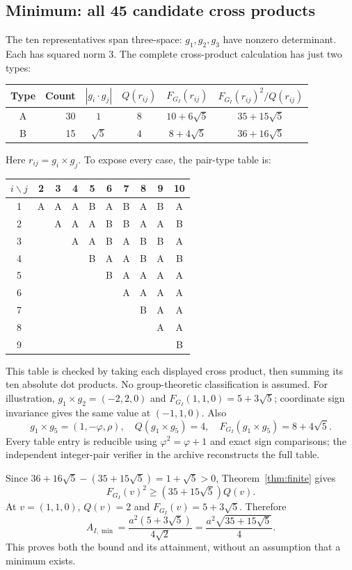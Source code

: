 \documentclass[11pt,a4paper]{article}
\newcommand{\ph}{\varphi}
\newcommand{\rr}{\rho}
\newcommand{\abs}[1]{\left|#1\right|}
\begin{document}
\subsection{Minimum: all 45 candidate cross products}
The ten representatives span three-space: $g_1,g_2,g_3$ have nonzero determinant. Each has squared norm $3$. The complete cross-product calculation has just two types:
\begin{center}
\small\renewcommand{\arraystretch}{1.45}
\begin{tabular}{@{}crcccc@{}}\toprule
Type&Count&$\abs{g_i\cdot g_j}$&$Q(r_{ij})$&$F_{G_I}(r_{ij})$&$F_{G_I}(r_{ij})^2/Q(r_{ij})$\\\midrule
A&30&$1$&$8$&$10+6\sqrt5$&$35+15\sqrt5$\\
B&15&$\sqrt5$&$4$&$8+4\sqrt5$&$36+16\sqrt5$\\\bottomrule
\end{tabular}
\end{center}
Here $r_{ij}=g_i\times g_j$. To expose every case, the pair-type table is:
\begin{center}
\small\renewcommand{\arraystretch}{1.2}
\begin{tabular}{@{}c*{9}{c}@{}}\toprule
$i\backslash j$&2&3&4&5&6&7&8&9&10\\\midrule
1&A&A&A&B&A&B&A&B&A\\
2&&A&A&A&B&B&A&A&B\\
3&&&A&A&B&A&B&B&A\\
4&&&&B&A&A&B&A&B\\
5&&&&&B&A&A&A&A\\
6&&&&&&A&A&A&A\\
7&&&&&&&B&A&A\\
8&&&&&&&&A&A\\
9&&&&&&&&&B\\\bottomrule
\end{tabular}
\end{center}
This table is checked by taking each displayed cross product, then summing its ten absolute dot products. No group-theoretic classification is assumed. For illustration, $g_1\times g_2=(-2,2,0)$ and $F_{G_I}(1,1,0)=5+3\sqrt5$; coordinate sign invariance gives the same value at $(-1,1,0)$. Also
\[
 g_1\times g_5=(1,-\ph,\rr),\quad Q(g_1\times g_5)=4,
 \quad F_{G_I}(g_1\times g_5)=8+4\sqrt5.
\]
Every table entry is reducible using $\ph^2=\ph+1$ and exact sign comparisons; the independent integer-pair verifier in the archive reconstructs the full table.

Since $36+16\sqrt5-(35+15\sqrt5)=1+\sqrt5>0$, Theorem~\ref{thm:finite} gives
\[
 F_{G_I}(v)^2\ge(35+15\sqrt5)Q(v).
\]
At $v=(1,1,0)$, $Q(v)=2$ and $F_{G_I}(v)=5+3\sqrt5$. Therefore
\[
 A_{I,\min}=\frac{a^2(5+3\sqrt5)}{4\sqrt2}
 =\frac{a^2\sqrt{35+15\sqrt5}}4.
\]
This proves both the bound and its attainment, without an assumption that a minimum exists.
\end{document}
